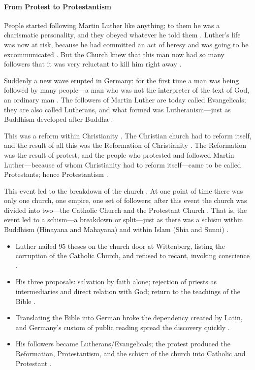 \paragraph{From Protest to Protestantism}
People started following Martin Luther like anything; to them he was a charismatic personality, and they obeyed whatever he told them .
Luther's life was now at risk, because he had committed an act of heresy and was going to be excommunicated . But the Church knew that this man now had so many followers that it was very reluctant to kill him right away .

Suddenly a new wave erupted in Germany: for the first time a man was being followed by many people---a man who was not the interpreter of the text of God, an ordinary man .
The followers of Martin Luther are today called Evangelicals; they are also called Lutherans, and what formed was Lutheranism---just as Buddhism developed after Buddha .

This was a reform within Christianity . The Christian church had to reform itself, and the result of all this was the Reformation of Christianity .
The Reformation was the result of protest, and the people who protested and followed Martin Luther---because of whom Christianity had to reform itself---came to be called Protestants; hence Protestantism .

\begin{KeyConcept}
This event led to the breakdown of the church . At one point of time there was only one church, one empire, one set of followers; after this event the church was divided into two---the Catholic Church and the Protestant Church .
That is, the event led to a schism---a breakdown or split---just as there was a schism within Buddhism (Hinayana and Mahayana) and within Islam (Shia and Sunni) .
\end{KeyConcept}

\begin{QuickRevision}
\begin{itemize}
    \item Luther nailed 95 theses on the church door at Wittenberg, listing the corruption of the Catholic Church, and refused to recant, invoking conscience .
    \item His three proposals: salvation by faith alone; rejection of priests as intermediaries and direct relation with God; return to the teachings of the Bible .
    \item Translating the Bible into German broke the dependency created by Latin, and Germany's custom of public reading spread the discovery quickly .
    \item His followers became Lutherans/Evangelicals; the protest produced the Reformation, Protestantism, and the schism of the church into Catholic and Protestant .
\end{itemize}
\end{QuickRevision}

